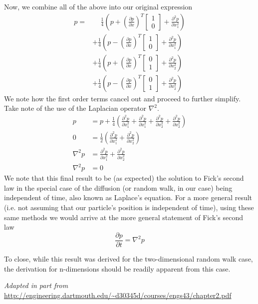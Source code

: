 Now, we combine all of the above into our original expression
\begin{align*}
    p =&\quad\, \frac{1}{4}\left(p + \left(\frac{\partial p}{\partial x}\right)^T \begin{bmatrix} 1\\0 \end{bmatrix} + \frac{\partial^2 p}{\partial x_1^2}\right)\\
    &+\frac{1}{4}\left(p - \left(\frac{\partial p}{\partial x}\right)^T \begin{bmatrix} 1\\0 \end{bmatrix} + \frac{\partial^2 p}{\partial x_1^2}\right)\\
    &+\frac{1}{4}\left(p + \left(\frac{\partial p}{\partial x}\right)^T \begin{bmatrix} 0\\1 \end{bmatrix} + \frac{\partial^2 p}{\partial x_2^2}\right)\\
    &+\frac{1}{4}\left(p - \left(\frac{\partial p}{\partial x}\right)^T \begin{bmatrix} 0\\1 \end{bmatrix} + \frac{\partial^2 p}{\partial x_2^2}\right)
\end{align*}
We note how the first order terms cancel out and proceed to further simplify. Take note of the use of the Laplacian operator $\nabla^2$.
\begin{align*}
    p &= p + \frac{1}{4}\left(\frac{\partial^2 p}{\partial x_1^2}+\frac{\partial^2 p}{\partial x_1^2}+\frac{\partial^2 p}{\partial x_2^2}+\frac{\partial^2 p}{\partial x_2^2}\right) \\
    0 &= \frac{1}{2}\left(\frac{\partial^2 p}{\partial x_1^2}+\frac{\partial^2 p}{\partial x_2^2}\right)\\
    \nabla^2 p &= \frac{\partial^2 p}{\partial x_1^2}+\frac{\partial^2 p}{\partial x_2^2}\\
    \nabla^2 p &= 0
\end{align*}
We note that this final result to be (as expected) the solution to Fick's second law in the special case of the diffusion (or random walk, in our case) being independent of time, also known as Laplace's equation. For a more general result (i.e. not assuming that our particle's position is independent of time), using these same methods we would arrive at the more general statement of Fick's second law
$$\frac{\partial p}{\partial t} = \nabla^2 p$$

To close, while this result was derived for the two-dimensional random walk case, the derivation for n-dimensions should be readily apparent from this case.


\vspace{12pt}


{\it Adapted in part from} \url{http://engineering.dartmouth.edu/~d30345d/courses/engs43/chapter2.pdf}